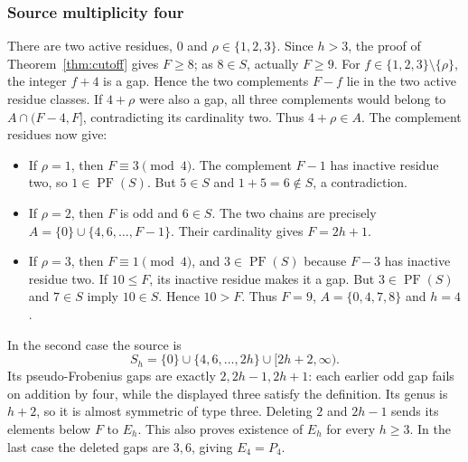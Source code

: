 \documentclass[11pt,a4paper]{article}
\theoremstyle{definition}
\theoremstyle{remark}
\newcommand{\PF}{\operatorname{PF}}
\begin{document}
\subsubsection{Source multiplicity four}
There are two active residues, $0$ and $\rho\in\{1,2,3\}$.
Since $h>3$, the proof of Theorem~\ref{thm:cutoff} gives $F\geq8$;
as $8\in S$, actually $F\geq9$.
For $f\in\{1,2,3\}\setminus\{\rho\}$, the integer $f+4$ is a gap.
Hence the two complements $F-f$ lie in the two active residue classes.
If $4+\rho$ were also a gap, all three complements would belong to
$A\cap(F-4,F]$, contradicting its cardinality two. Thus $4+\rho\in A$.
The complement residues now give:
\begin{itemize}
\item If $\rho=1$, then $F\equiv3\pmod4$. The complement $F-1$ has
inactive residue two, so $1\in\PF(S)$. But $5\in S$ and $1+5=6\notin S$,
a contradiction.
\item If $\rho=2$, then $F$ is odd and $6\in S$. The two chains are
precisely $A=\{0\}\cup\{4,6,\ldots,F-1\}$. Their cardinality gives
$F=2h+1$.
\item If $\rho=3$, then $F\equiv1\pmod4$, and $3\in\PF(S)$ because
$F-3$ has inactive residue two. If $10\leq F$, its inactive residue
makes it a gap. But $3\in\PF(S)$ and $7\in S$ imply $10\in S$.
Hence $10>F$. Thus $F=9$, $A=\{0,4,7,8\}$ and $h=4$.
\end{itemize}
In the second case the source is
\begin{equation}\label{eq:even-source}
 S_h=\{0\}\cup\{4,6,\ldots,2h\}\cup[2h+2,\infty).
\end{equation}
Its pseudo-Frobenius gaps are exactly $2,2h-1,2h+1$: each earlier odd
gap fails on addition by four, while the displayed three satisfy the
definition. Its genus is $h+2$, so it is almost symmetric of type three.
Deleting $2$ and $2h-1$ sends its elements below $F$ to $E_h$.
This also proves existence of $E_h$ for every $h\geq3$.
In the last case the deleted gaps are $3,6$, giving $E_4=P_4$.
\end{document}
